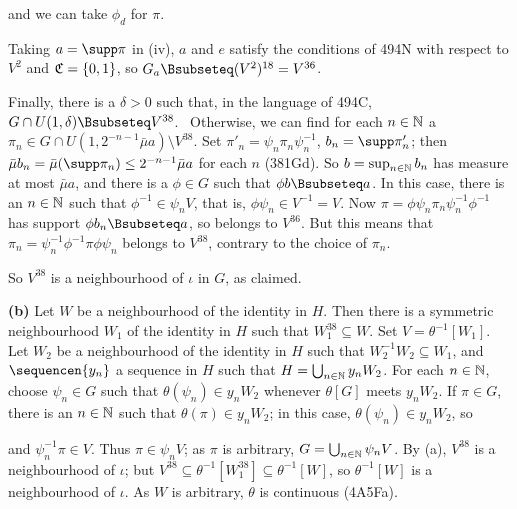 {

\noindent and we can take $\phi_d$ for $\pi$.\ \Qed

\medskip

 Taking $a=\supp\pi$ in (iv), $a$ and $e$ satisfy the
conditions of 494N with respect to $V^2$ and $\frak C=\{0,1\}$, so
$G_a\Bsubseteq(V^2)^{18}=V^{36}$.

\medskip

  Finally, there is a $\delta>0$ such that, in the language
of 494C,
$G\cap U(1,\delta)\Bsubseteq V^{38}$.   \Prf\Quer\ Otherwise, we can find
for each $n\in\Bbb N$ a
$\pi_n\in G\cap U(1,2^{-n-1}\bar\mu a)\setminus V^{38}$.   Set
$\pi'_n=\psi_n\pi_n\psi_n^{-1}$, $b_n=\supp\pi'_n$;  then
$\bar\mu b_n=\bar\mu(\supp\pi_n)\le 2^{-n-1}\bar\mu a$ for each $n$
(381Gd).   So
$b=\sup_{n\in\Bbb N}b_n$ has measure at most $\bar\mu a$, and there is a
$\phi\in G$ such that $\phi b\Bsubseteq a$.
In this case,
there is an $n\in\Bbb N$ such that $\phi^{-1}\in\psi_nV$, that is,
$\phi\psi_n\in V^{-1}=V$.   Now
$\pi=\phi\psi_n\pi_n\psi_n^{-1}\phi^{-1}$ has support
$\phi b_n\Bsubseteq a$, so belongs to $V^{36}$.   But this means that
$\pi_n=\psi_n^{-1}\phi^{-1}\pi\phi\psi_n$ belongs to $V^{38}$, contrary to
the choice of $\pi_n$.\ \Bang\Qed

So $V^{38}$ is a neighbourhood of $\iota$ in $G$, as claimed.

\medskip

{\bf (b)} Let $W$ be a neighbourhood of the identity in $H$.   Then there
is a symmetric neighbourhood $W_1$ of the identity in $H$ such that
$W_1^{38}\subseteq W$.   Set $V=\theta^{-1}[W_1]$.   Let $W_2$ be a
neighbourhood of the identity in $H$ such that
$W_2^{-1}W_2\subseteq W_1$, and
$\sequencen{y_n}$ a sequence in $H$ such that
$H=\bigcup_{n\in\Bbb N}y_nW_2$.
For each $n\in\Bbb N$, choose $\psi_n\in G$ such that
$\theta(\psi_n)\in y_nW_2$ whenever $\theta[G]$ meets $y_nW_2$.
If $\pi\in G$, there is an $n\in\Bbb N$ such that
$\theta(\pi)\in y_nW_2$;   in this case, $\theta(\psi_n)\in y_nW_2$, so


\noindent and
$\psi_n^{-1}\pi\in V$.   Thus $\pi\in\psi_nV$;  as $\pi$ is arbitrary,
$G=\bigcup_{n\in\Bbb N}\psi_nV$.   By (a), $V^{38}$ is a neighbourhood
of $\iota$;  but
$V^{38}\subseteq\theta^{-1}[W_1^{38}]\subseteq\theta^{-1}[W]$, so
$\theta^{-1}[W]$ is a neighbourhood of $\iota$.   As $W$ is
arbitrary, $\theta$ is continuous (4A5Fa).
}%


